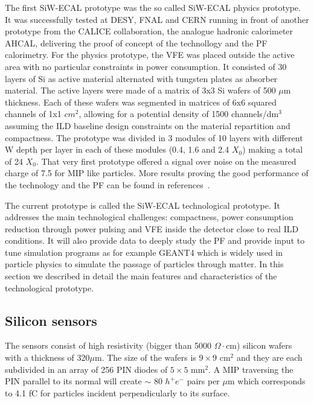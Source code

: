 \documentclass[a4paper,11pt]{article}
\begin{document}
The first SiW-ECAL prototype was the so called SiW-ECAL physics prototype.
It was successfully tested at DESY, FNAL and CERN running in front of another prototype from the CALICE
collaboration, the analogue hadronic calorimeter AHCAL, delivering the proof of concept of the technollogy
and the PF calorimetry.
For the physics prototype, the VFE was placed outside the active area with no particular constraints in power consumption.
It consisted of 30 layers of Si as active material alternated with tungsten plates as absorber material.
The active layers were made of a matrix of 3x3 Si wafers of 500 $\mu$m thickness. Each of these wafers was segmented in matrices of
6x6 squared channels of 1x1 $cm^{2}$, allowing for a potential density of 1500 channels/dm$^{3}$ assuming
the ILD baseline design constraints on the material repartition and compactness.
The prototype was divided in 3 modules of 10 layers with different W depth per layer in each of these modules
(0.4, 1.6 and 2.4 $X_{0}$) making a total of 24 $X_{0}$.
That very first prototype offered a signal over noise on the measured charge of 7.5 for MIP like 
particles. More results proving the good performance of the technology and the PF can be found in
references~\cite{Adloff:2011ha,Anduze:2008hq,Adloff:2008aa,Adloff:2010xj,CALICE:2011aa,Bilki:2014uep}.

The current prototype is called the SiW-ECAL technological prototype. It addresses the main technological challenges: compactness,
power consumption reduction through power pulsing and VFE inside the detector close to real ILD conditions.
It will also provide data to deeply study the PF and provide input to tune simulation programs as for example
GEANT4\cite{Agostinelli:2002hh,Allison:2006ve,Allison:2016lfl} which is widely used
in particle physics to simulate the passage of particles through matter. In this section we described in detail
the main features and characteristics of the technological prototype.

\subsection{Silicon sensors}
\label{sec:wafers}

The sensors consist of high resistivity (bigger than 5000 $\Omega\cdot$cm)
silicon wafers with a thickness of 320$\mu$m.
The size of the wafers is $9\times9$ cm$^{2}$ and they are each subdivided in an array of 256 PIN diodes of $5\times5$ mm$^{2}$.
A MIP traversing the PIN parallel to its normal will create $\sim$ 80 $h^{+}e^{-}$ pairs per $\mu$m which corresponds to 4.1 fC
for particles incident perpendicularly to its surface.
\end{document}
